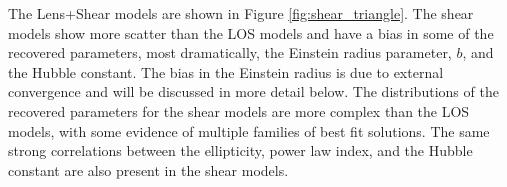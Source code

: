 The Lens+Shear models are shown in Figure \ref{fig:shear_triangle}. The shear models show more scatter than the LOS models and have a bias in some of the recovered parameters, most dramatically, the Einstein radius parameter, $b$, and the Hubble constant. The bias in the Einstein radius is due to external convergence and will be discussed in more detail below. The distributions of the recovered parameters for the shear models are more complex than the LOS models, with some evidence of multiple families of best fit solutions. The same strong correlations between the ellipticity, power law index, and the Hubble constant are also present in the shear models. 